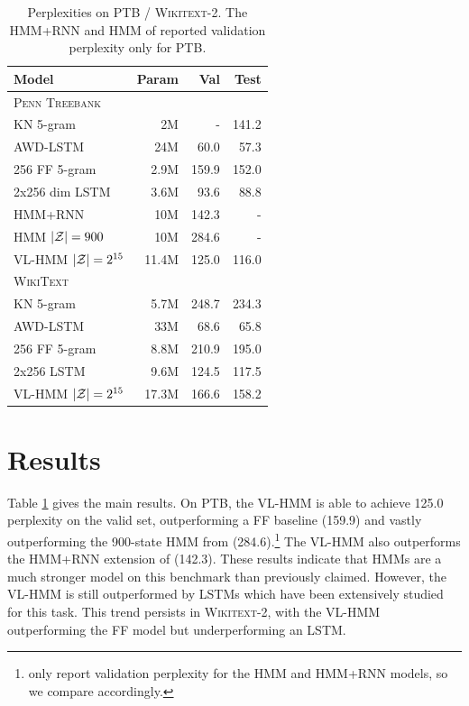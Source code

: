 \documentclass[11pt,a4paper]{article}
\begin{document}
\begin{table}[!t]
\centering
\begin{tabular}{lrrr}
\toprule
Model & Param & Val  & Test \\
\midrule
\textsc{Penn Treebank}\\
\midrule
KN 5-gram              & 2M   & - & 141.2\\
AWD-LSTM               & 24M  & 60.0 & 57.3\\
256 FF 5-gram          & 2.9M & 159.9      & 152.0  \\
2x256 dim LSTM         & 3.6M & 93.6       & 88.8   \\
HMM+RNN                & 10M  & 142.3 & -\\
HMM $|\mathcal{Z}|=900$       & 10M  & 284.6 & -\\
VL-HMM $|\mathcal{Z}|=2^{15}$ & 11.4M & 125.0      & 116.0  \\
\midrule
\textsc{WikiText}\\
\midrule
KN 5-gram               & 5.7M    & 248.7 & 234.3\\
AWD-LSTM                & 33M     & 68.6  & 65.8\\
256 FF 5-gram           & 8.8M    & 210.9 & 195.0\\
2x256  LSTM             & 9.6M    & 124.5 & 117.5\\
VL-HMM $|\mathcal{Z}|=2^{15}$  & 17.3M   & 166.6  & 158.2\\
\bottomrule
\end{tabular}
\caption{\label{tbl:ppl}
Perplexities on \textsc{PTB / Wikitext-2}.
The HMM+RNN and HMM of \citet{buys2018hmm} reported validation perplexity only for \textsc{PTB}.
}
\end{table}


\section{Results}
Table \ref{tbl:ppl} gives the main results.
On \textsc{PTB}, the VL-HMM is able to achieve 125.0 perplexity on the valid set,
outperforming a FF baseline (159.9)
and vastly outperforming the 900-state HMM from \citet{buys2018hmm} (284.6).\footnote{
\citet{buys2018hmm} only report validation perplexity
for the HMM and HMM+RNN models, so we compare accordingly.}
The VL-HMM also outperforms the HMM+RNN extension of \citet{buys2018hmm} (142.3).
These results indicate that HMMs are a much stronger model
on this benchmark than previously claimed.
However, the VL-HMM is still outperformed by LSTMs which have been extensively studied for this task.
This trend persists in \textsc{Wikitext-2},
with the VL-HMM outperforming the FF model but underperforming an LSTM.
\end{document}
